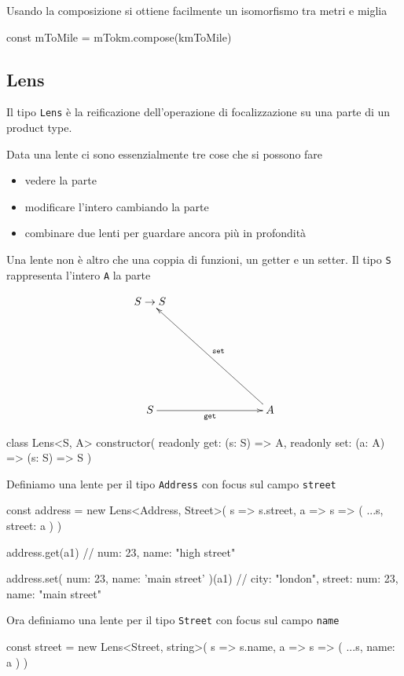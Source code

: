 \documentclass[12pt]{article}
\theoremstyle{definition}
\newenvironment{code}
  {\vspace{0.5cm} \VerbatimEnvironment\begin{typescriptcode}}
  {\end{typescriptcode} \vspace{0.2cm}}
\begin{document}
Usando la composizione si ottiene facilmente un isomorfismo tra metri e miglia

\begin{code}
const mToMile = mTokm.compose(kmToMile)
\end{code}

\subsection{Lens}

Il tipo \texttt{Lens} è la reificazione dell'operazione di focalizzazione su una parte di un product type.

Data una lente ci sono essenzialmente tre cose che si possono fare

\begin{itemize}
  \item vedere la parte
  \item modificare l'intero cambiando la parte
  \item combinare due lenti per guardare ancora più in profondità
\end{itemize}

Una lente non è altro che una coppia di funzioni, un getter e un setter. Il tipo \texttt{S} rappresenta l'intero \texttt{A} la parte

\[
\xymatrixrowsep{3cm}
\xymatrixcolsep{3cm}
\xymatrix{
  {S \rightarrow S} \\
  S \ar[r]_{\texttt{get}} & A \ar[lu]_{\texttt{set}}
}
\]

\begin{code}
class Lens<S, A> {
  constructor(
    readonly get: (s: S) => A,
    readonly set: (a: A) => (s: S) => S
  ) {}
}
\end{code}

Definiamo una lente per il tipo \texttt{Address} con focus sul campo \texttt{street}

\begin{code}
const address = new Lens<Address, Street>(
  s => s.street,
  a => s => ({ ...s, street: a })
)

address.get(a1)
// { num: 23, name: "high street" }

address.set({ num: 23, name: 'main street' })(a1)
// { city: "london", street: { num: 23, name: "main street" } }
\end{code}

Ora definiamo una lente per il tipo \texttt{Street} con focus sul campo \texttt{name}

\begin{code}
const street = new Lens<Street, string>(
  s => s.name,
  a => s => ({ ...s, name: a })
)
\end{code}
\end{document}
